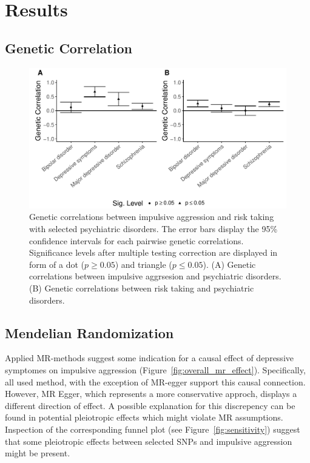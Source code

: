 \section{Results}
\label{sec:results}

\subsection{Genetic Correlation}
\label{sub:psych_genetic_correlation}





\begin{figure}[htpb]
  \centering
  \includegraphics[width=0.8\linewidth]{figures/combined_corr.pdf}
  \caption{Genetic correlations between impulsive aggression and risk taking with selected psychiatric disorders.
    The error bars display the 95\% confidence intervals for each pairwise genetic correlations.
    Significance levels after multiple testing correction are displayed in form of a dot ($p\ge 0.05$) and triangle ($p\leq0.05$).
    (A) Genetic correlations between impulsive aggrsesion and psychiatric disorders. 
    (B) Genetic correlations between risk taking and psychiatric disorders.
  }\label{fig:figures/combined_corr}
\end{figure}

\subsection{Mendelian Randomization}
\label{sub:mendelian_randomization}

Applied MR-methods suggest some indication for a causal effect of depressive symptomes on impulsive aggression (Figure~\ref{fig:overall_mr_effect}).
Specifically, all used method, with the exception of MR-egger support this causal connection.
However, MR Egger, which represents a more conservative approch, displays a different direction of effect.
A possible explanation for this discrepency can be found in potential pleiotropic effects which might violate MR assumptions.
Inspection of the corresponding funnel plot (see Figure~\ref{fig:sensitivity}) suggest that some pleiotropic effects between selected SNPs and impulsive aggression might be present.

